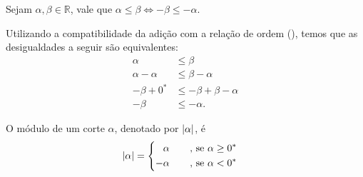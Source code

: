 \documentclass[../main.tex]{subfiles}
\begin{document}
\begin{teo}\label{reais-teo-desigualdadeSimetrico}
    Sejam $\alpha, \beta \in \mathbb{R}$, vale que $\alpha \leq \beta \iff -\beta \leq -\alpha$.
\end{teo}
\begin{dem}
    Utilizando a compatibilidade da adição com a relação de ordem (), temos que as desigualdades a seguir são equivalentes:
    \begin{align*}
        \alpha &\leq \beta \\
        \alpha - \alpha &\leq \beta - \alpha \\
        -\beta + 0^* &\leq - \beta + \beta - \alpha \\
        -\beta &\leq -\alpha.
    \end{align*}
\end{dem}

\begin{defi}
    O módulo de um corte $\alpha$, denotado por $\abs{\alpha}$, é 
    \begin{equation}
        \abs{\alpha} = 
        \begin{cases}
        \begin{aligned}
             &\alpha \hspace{0.6cm} \text{ , se } \alpha \geq 0^* \\
            -&\alpha \hspace{0.6cm} \text{ , se } \alpha < 0^*
        \end{aligned}
        \end{cases}            
    \end{equation}
\end{defi}
\end{document}
